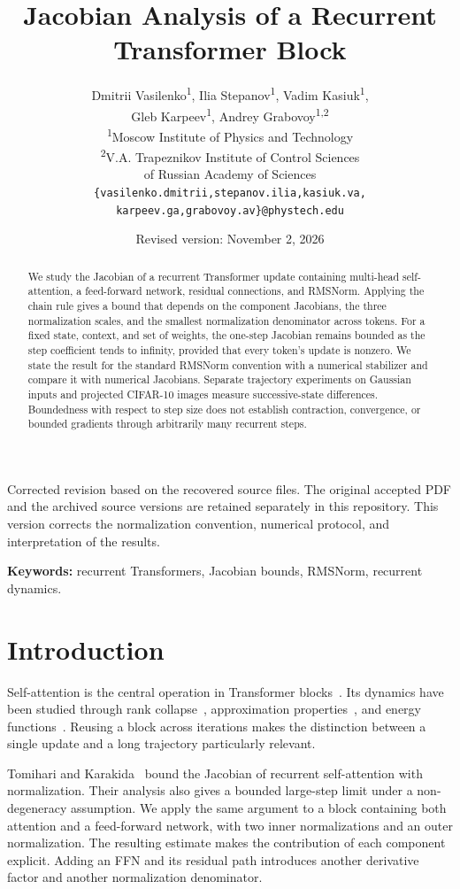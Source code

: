 \documentclass[11pt]{article}
\title{Jacobian Analysis of a Recurrent Transformer Block}
\author{Dmitrii Vasilenko\textsuperscript{1}, Ilia Stepanov\textsuperscript{1}, Vadim Kasiuk\textsuperscript{1},\\
Gleb Karpeev\textsuperscript{1}, Andrey Grabovoy\textsuperscript{1,2}\\[0.4em]
\small\textsuperscript{1}Moscow Institute of Physics and Technology\\
\small\textsuperscript{2}V.A. Trapeznikov Institute of Control Sciences\\
\small of Russian Academy of Sciences\\[0.4em]
\small\texttt{\{vasilenko.dmitrii,stepanov.ilia,kasiuk.va,}\\
\small\texttt{karpeev.ga,grabovoy.av\}@phystech.edu}}
\date{Revised version: November 2, 2026}
\numberwithin{equation}{section}
\begin{document}
\maketitle
\begin{center}
\small Corrected revision based on the recovered source files. The original
accepted PDF and the archived source versions are retained separately in this
repository. This version corrects the normalization convention, numerical
protocol, and interpretation of the results.
\end{center}

\begin{abstract}
We study the Jacobian of a recurrent Transformer update containing multi-head
self-attention, a feed-forward network, residual connections, and RMSNorm.
Applying the chain rule gives a bound that depends on the component Jacobians,
the three normalization scales, and the smallest normalization denominator across
tokens. For a fixed state, context, and set of weights, the one-step Jacobian
remains bounded as the step coefficient tends to infinity, provided that every
token's update is nonzero. We state the result for the standard RMSNorm convention
with a numerical stabilizer and compare it with numerical Jacobians. Separate
trajectory experiments on Gaussian inputs and projected CIFAR-10 images measure
successive-state differences. Boundedness with respect to step size does not
establish contraction, convergence, or bounded gradients through arbitrarily many
recurrent steps.
\end{abstract}
\noindent\textbf{Keywords:} recurrent Transformers, Jacobian bounds, RMSNorm,
recurrent dynamics.

\section{Introduction}
Self-attention is the central operation in Transformer
blocks~\cite{vaswani2017attention}. Its dynamics have been studied through rank
collapse~\cite{noci2022signal}, approximation
properties~\cite{yun2020universal,kajitsuka2024universal,nichani2025recall}, and
energy functions~\cite{ramsauer2021hopfield,yang2022optimization,hoover2023energy}.
Reusing a block across iterations makes the distinction between a single update
and a long trajectory particularly relevant.

Tomihari and Karakida~\cite{tomihari2025recurrent} bound the Jacobian of recurrent
self-attention with normalization. Their analysis also gives a bounded
large-step limit under a non-degeneracy assumption. We apply the same argument
to a block containing both attention and a feed-forward network, with two inner
normalizations and an outer normalization. The resulting estimate makes the
contribution of each component explicit. Adding an FFN and its residual path
introduces another derivative factor and another normalization denominator.
\end{document}
